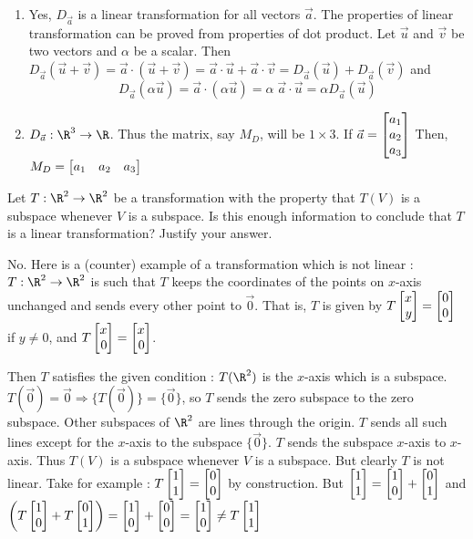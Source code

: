 \begin{exercises}
\begin{problist}
\begin{solution}
\begin{enumerate}
				\item Yes, $D_{\vec{a}}$ is a linear transformation for all vectors $\vec{a}$. The properties of linear transformation can be proved from properties of dot product. Let $\vec{u}$ and $\vec{v}$ be two vectors and $\alpha$ be a scalar. Then
$D_{\vec{a}}(\vec{u} + \vec{v})= \vec{a} \cdot (\vec{u}+ \vec{v}) =  \vec{a} \cdot \vec{u}+ \vec{a} \cdot \vec{v} = D_{\vec{a}}(\vec{u}) + D_{\vec{a}}(\vec{v})$ and
\[
D_{\vec{a}}(\alpha \vec{u}) =  \vec{a} \cdot ( \alpha \vec{u}) = \alpha \; \vec{a} \cdot \vec{u} = \alpha D_{\vec{a}}(\vec{u})
\]
				\item $D_{\vec{a}} : \R^3 \rightarrow \R$. Thus the matrix, say $M_D$, will be $1 \times 3$. If $\vec{a} = \mat{a_1\\a_2\\ a_3} $ Then, $M_D = \mat{a_1 & a_2 & a_3}$
			\end{enumerate}
		\end{solution}

		\prob Let $T:\R^2\to\R^2$ be a transformation with the property that $T(V)$ is a subspace
		whenever $V$ is a subspace. Is this enough information to conclude that $T$ is a linear
		transformation? Justify your answer.
		\begin{solution}
			No. Here is a (counter) example of a transformation which is not linear :
	$T : \R^2 \rightarrow \R^2$ is such that $T$ keeps the coordinates of the points on $x$-axis unchanged and sends every other point to $\vec{0}$. That is, $T$ is given by $T \mat{x\\y} = \mat{0\\0}$ if $y\neq 0$, and $T\mat{x\\0} = \mat{x\\0}$.

		Then $T$ satisfies the given condition : $T(\R^2)$ is the $x$-axis which is a subspace. $T(\vec{0})= \vec{0} \Rightarrow \{T(\vec{0}) \} = \{\vec{0}\}$, so $T$ sends the zero subspace to the zero subspace.  Other subspaces of $\R^2$ are lines through the origin. $T$ sends all such lines except for the $x$-axis to the subspace $\{ \vec{0}\}$. $T$ sends the subspace $x$-axis to $x$-axis. Thus $T(V)$ is a subspace whenever $V$ is a subspace. But clearly $T$ is not linear. Take for example : $T \mat{1\\1} = \mat{0\\0}$ by construction. But $\mat{1\\1} = \mat{1\\0} + \mat{0\\1}$ and $\left(   T\mat{1\\0} + T \mat{0\\1}  \right)= \mat{1\\0} + \mat{0\\0} = \mat{1\\0} \neq T \mat{1\\1} $
		\end{solution}


\end{problist}
\end{exercises}
